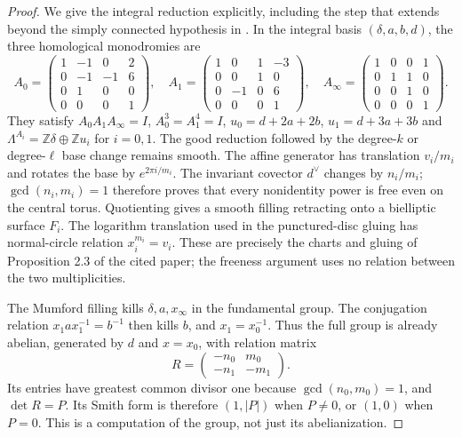 \begin{proof}
We give the integral reduction explicitly, including the step that
extends beyond the simply connected hypothesis in
\cite[Propositions 4.1, 4.3, 4.5]{manViaclovskyLogs26}.
In the integral basis $(\delta,a,b,d)$, the three homological
monodromies are
\[
 A_0=\begin{pmatrix}1&-1&0&2\\0&-1&-1&6\\0&1&0&0\\0&0&0&1\end{pmatrix},\quad
 A_1=\begin{pmatrix}1&0&1&-3\\0&0&1&0\\0&-1&0&6\\0&0&0&1\end{pmatrix},\quad
 A_\infty=\begin{pmatrix}1&0&0&1\\0&1&1&0\\0&0&1&0\\0&0&0&1\end{pmatrix}.
\]
They satisfy $A_0A_1A_\infty=I$, $A_0^3=A_1^4=I$,
$u_0=d+2a+2b$, $u_1=d+3a+3b$ and
$\Lambda^{A_i}=\mathbb Z\delta\oplus\mathbb Zu_i$ for $i=0,1$.
The good reduction followed by the degree-$k$ or degree-$\ell$
base change remains smooth. The affine generator has translation
$v_i/m_i$ and rotates the base by $e^{2\pi i/m_i}$.
The invariant covector $d^\vee$ changes by $n_i/m_i$;
$\gcd(n_i,m_i)=1$ therefore proves that every nonidentity power
is free even on the central torus. Quotienting gives a smooth
filling retracting onto a bielliptic surface $F_i$.
The logarithm translation used in the punctured-disc gluing has
normal-circle relation $x_i^{m_i}=v_i$. These are precisely the
charts and gluing of Proposition 2.3 of the cited paper; the
freeness argument uses no relation between the two multiplicities.

The Mumford filling kills $\delta,a,x_\infty$ in the fundamental
group. The conjugation relation $x_1ax_1^{-1}=b^{-1}$ then kills
$b$, and $x_1=x_0^{-1}$. Thus the full group is already abelian,
generated by $d$ and $x=x_0$, with relation matrix
\[
 R=\begin{pmatrix}-n_0&m_0\\-n_1&-m_1\end{pmatrix}.
\]
Its entries have greatest common divisor one because
$\gcd(n_0,m_0)=1$, and $\det R=P$. Its Smith form is therefore
$(1,|P|)$ when $P\ne0$, or $(1,0)$ when $P=0$.
This is a computation of the group, not just its abelianization.


\end{proof}
